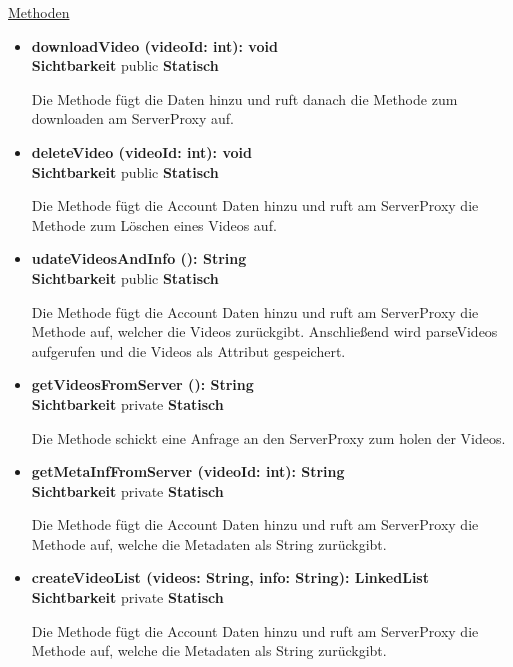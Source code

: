 \underline{Methoden}
\begin{itemize}
\itemsep0pt


\item \textbf{downloadVideo (videoId: int): void}\hfill\\
\textbf{Sichtbarkeit} public \newline
\textbf{Statisch}

Die Methode fügt die  Daten hinzu und ruft danach die Methode zum downloaden am ServerProxy auf.

\item \textbf{deleteVideo (videoId: int): void}\hfill\\
\textbf{Sichtbarkeit} public \newline
\textbf{Statisch}

Die Methode fügt die Account Daten hinzu und ruft am ServerProxy die Methode zum Löschen eines Videos auf.

\item \textbf{udateVideosAndInfo (): String}\hfill\\
\textbf{Sichtbarkeit} public \newline
\textbf{Statisch}

Die Methode fügt die Account Daten hinzu und ruft am ServerProxy die Methode auf, welcher die Videos zurückgibt. Anschließend wird parseVideos aufgerufen und die Videos als Attribut gespeichert.

\item \textbf{getVideosFromServer (): String}\hfill\\
\textbf{Sichtbarkeit} private \newline
\textbf{Statisch}

Die Methode schickt eine Anfrage an den ServerProxy zum holen der Videos.

\item \textbf{getMetaInfFromServer (videoId: int): String}\hfill\\
\textbf{Sichtbarkeit} private \newline
\textbf{Statisch}

Die Methode fügt die Account Daten hinzu und ruft am ServerProxy die Methode auf, welche die Metadaten als String zurückgibt.

\item \textbf{createVideoList (videos: String, info: String): LinkedList}\hfill\\
\textbf{Sichtbarkeit} private \newline
\textbf{Statisch}

Die Methode fügt die Account Daten hinzu und ruft am ServerProxy die Methode auf, welche die Metadaten als String zurückgibt.

\end{itemize}